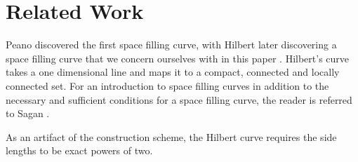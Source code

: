 \section{Related Work}

Peano discovered the first space filling curve, with Hilbert later discovering
a space filling curve that we concern ourselves with in this paper \cite{hilbert2004david}.
Hilbert's curve takes a one dimensional line and maps it to a compact, connected and locally connected
set.
For an introduction to space filling curves in addition to the necessary and sufficient
conditions for a space filling curve, the reader is referred to Sagan \cite{sagan_1994}.

As an artifact of the construction scheme, the Hilbert curve requires the side lengths to be exact powers of two.


%
%
%
%
%
%
%
%
%
%
%
%
%
%
%
